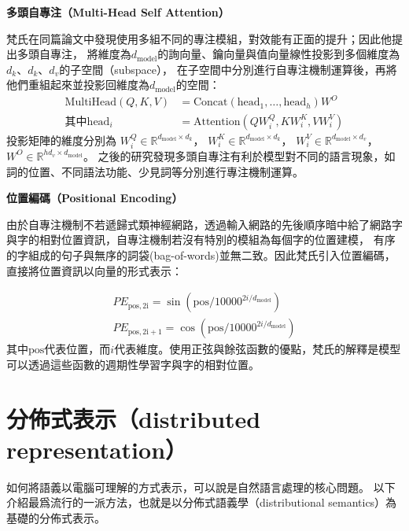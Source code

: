 \vspace{12pt}
\noindent\textbf{多頭自專注（Multi-Head Self Attention）}
\vspace{4pt}

梵氏在同篇論文中發現使用多組不同的專注模組，對效能有正面的提升；因此他提出多頭自專注，
將維度為$d_{\mathrm{model}}$的詢向量、鑰向量與值向量線性投影到多個維度為$d_k$、$d_k$、$d_v$的子空間（subspace），
在子空間中分別進行自專注機制運算後，再將他們重組起來並投影回維度為$d_{\mathrm{model}}$的空間：
\begin{equation}
    \begin{split}
    \mathrm{MultiHead}(Q, K, V) &= \mathrm{Concat} (\mathrm{head}_{1}, \ldots, \mathrm{head}_{h}) W^{O} \\
        \text{其中}\mathrm{head}_{i} &= \mathrm{Attention} (QW_{i}^{Q}, KW_{i}^{K}, VW_{i}^{V})
    \end{split}
\end{equation}
投影矩陣的維度分別為
$W_{i}^{Q} \in \mathbb{R}^{d_{\mathrm{model}} \times d_{k}}$，
$W_{i}^{K} \in \mathbb{R}^{d_{\mathrm{model}} \times d_{k}}$，
$W_{i}^{V} \in \mathbb{R}^{d_{\mathrm{model}} \times d_{v}}$，
$W^{O} \in \mathbb{R}^{hd_{v} \times d_{\mathrm{model}}}$。
之後的研究發現多頭自專注有利於模型對不同的語言現象，如詞的位置、不同語法功能、少見詞等分別進行專注機制運算\cite{voita-etal-2019-analyzing}。

\vspace{12pt}
\noindent\textbf{位置編碼（Positional Encoding）}
\vspace{4pt}

由於自專注機制不若遞歸式類神經網路，透過輸入網路的先後順序暗中給了網路字與字的相對位置資訊，自專注機制若沒有特別的模組為每個字的位置建模，
有序的字組成的句子與無序的詞袋(bag-of-words)並無二致。因此梵氏引入位置編碼，直接將位置資訊以向量的形式表示：

\begin{equation}
    \begin{split}
    {PE}_{\mathrm{pos},\mathrm{2i}} = \sin (\mathrm{pos} / 10000^{2i / d_{\mathrm{model}}}) \\
    {PE}_{\mathrm{pos},\mathrm{2i}+1} = \cos (\mathrm{pos} / 10000^{2i / d_{\mathrm{model}}})
    \end{split}
\end{equation}
其中$\mathrm{pos}$代表位置，而$i$代表維度。使用正弦與餘弦函數的優點，梵氏的解釋是模型可以透過這些函數的週期性學習字與字的相對位置。

\section{分佈式表示（distributed representation）}
如何將語義以電腦可理解的方式表示，可以說是自然語言處理的核心問題。
以下介紹最爲流行的一派方法，也就是以分佈式語義學（distributional semantics）為基礎的分佈式表示。



